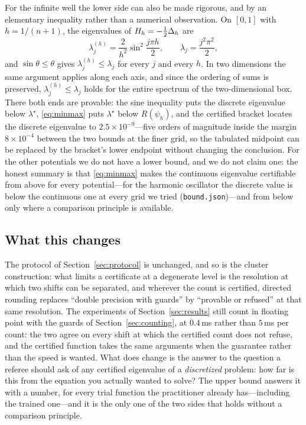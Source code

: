 For the infinite well the lower side can also be made rigorous, and by an elementary
inequality rather than a numerical observation. On $[0,1]$ with $h=1/(n+1)$,
the eigenvalues of $H_h=-\tfrac12\Delta_h$ are
\begin{equation}
  \lambda_j^{(h)} = \frac{2}{h^2}\sin^2\frac{j\pi h}{2},
  \qquad
  \lambda_j = \frac{j^2\pi^2}{2},
  \label{eq:sine}
\end{equation}
and $\sin\theta\le\theta$ gives $\lambda_j^{(h)}\le\lambda_j$ for every $j$ and
every $h$. In two dimensions the same argument applies along each axis, and
since the ordering of sums is preserved, $\lambda^{(h)}_j\le\lambda_j$ holds
for the entire spectrum of the two-dimensional box. There both ends are
provable: the sine inequality puts the discrete eigenvalue below
$\lambda^\star$, \eqref{eq:minmax} puts $\lambda^\star$ below $R(\psi_h)$, and
the certified bracket locates the discrete eigenvalue to
$2.5\times10^{-9}$---five orders of magnitude inside the margin
$8\times10^{-4}$ between the two bounds at the finer grid, so the tabulated
midpoint can be replaced by the bracket's lower endpoint without changing the
conclusion. For the other potentials
we do not have a lower bound, and we do not claim one: the honest summary is
that \eqref{eq:minmax} makes the continuous eigenvalue certifiable from above
for every potential---for the harmonic oscillator the discrete value is below
the continuous one at every grid we tried (\texttt{bound.json})---and from
below only where a comparison principle is available.

\subsection{What this changes}

The protocol of Section~\ref{sec:protocol} is unchanged, and so is the cluster
construction: what limits a certificate at a degenerate level is the
resolution at which two shifts can be separated, and wherever the count is
certified, directed rounding replaces ``double precision with guards'' by
``provable or refused'' at that same resolution. The experiments of Section~\ref{sec:results} still count in
floating point with the guards of Section~\ref{sec:counting}, at $0.4$\,ms
rather than $5$\,ms per count: the two agree on every shift at which the
certified count does not refuse, and the certified function takes the same
arguments when the guarantee rather than the speed is wanted. What does change
is the answer to the question a referee
should ask of any certified eigenvalue of a \emph{discretized} problem: how
far is this from the equation you actually wanted to solve? The upper bound
answers it with a number, for every trial function the practitioner already
has---including the trained one---and it is the only one of the two sides that
holds without a comparison principle.
